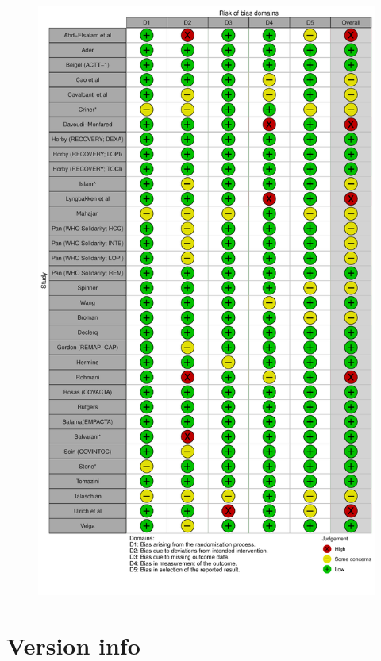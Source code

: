 \documentclass[
  letterpaper,
  DIV=11,
  numbers=noendperiod]{scrreprt}
\begin{document}
\begin{figure}[H]

{\centering \includegraphics{chapter_03_files/figure-pdf/unnamed-chunk-3-1.pdf}

}

\end{figure}

\hypertarget{version-info}{%
\section*{Version info}\label{version-info}}
\end{document}
